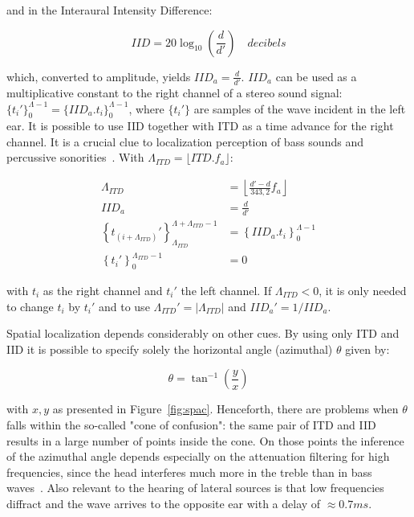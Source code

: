 \noindent and in the Interaural Intensity Difference:

\begin{equation}\label{eq:dii}
IID=20\log_{10}\left (\frac{d}{d'}\right) \quad decibels
\end{equation}

\noindent which, converted to amplitude, yields $IID_a=\frac{d}{d'}$. $IID_a$ can be used as a multiplicative constant to the right channel of a stereo sound signal: $\{t_i'\}_0^{\Lambda -1}=\{IID_a . t_i\}_0^{\Lambda -1}$, where $\{t_i'\}$ are samples of the wave incident in the left ear. It is possible to use IID together with ITD as a time advance for the right channel. It is a crucial clue to localization perception of bass sounds and percussive sonorities~\cite{Heeger}. 
With $\Lambda_{ITD}=\lfloor ITD . f_a \rfloor$:

\begin{equation}\label{eq:locImpl}
\begin{split}
\Lambda_{ITD} & = \left \lfloor \frac{d'-d}{343,2}  f_a \right \rfloor \\
IID_a & = \frac{d}{d'} \\
\left\{t_{(i+\Lambda_{ITD})}'\right\}_{\Lambda_{ITD}}^{\Lambda+\Lambda_{ITD}-1} & =\left\{IID_a . t_i\right\}_0^{\Lambda-1} \\
\left\{t_i'\right\}_0^{\Lambda_{ITD}-1} & = 0
\end{split}
\end{equation}

\noindent with $t_i$ as the right channel and $t_i'$ the left channel. If $\Lambda_{ITD} < 0 $, it is only needed to change $t_i$ by $t_i'$ and to use $\Lambda_{ITD}'= | \Lambda_{ITD} | $ and $IID_a'=1 / IID_a$.

Spatial localization depends considerably on other cues. By using only ITD and IID it is possible to specify solely the horizontal angle (azimuthal) $\theta$ given by:

\begin{equation}\label{eq:angulo}
\theta=\tan^{-1}\left ( \frac{y}{ x }  \right )
\end{equation}

\noindent with $x,y$ as presented in Figure~\ref{fig:spac}. Henceforth, there are problems when $\theta$ falls within the so-called "cone of confusion": the same pair of ITD and IID results in a large number of points inside the cone. On those points the inference of the azimuthal angle depends especially on the attenuation filtering for high frequencies, since the head interferes much more in the treble than in bass waves~\cite{Heeger,hrtf}. Also relevant to the hearing of lateral sources is that low frequencies diffract and the wave arrives to the opposite ear with a delay of $\approx 0.7ms$.\cite{floEsp}

